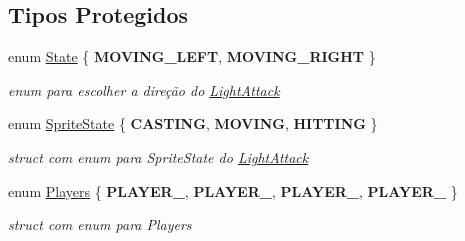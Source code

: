 \subsection*{Tipos Protegidos}
\begin{DoxyCompactItemize}
\item 
\mbox{\label{classLightAttack_abbd40d40cfc1c4d9ca5f8187b10848c8}} 
enum \mbox{\hyperlink{classLightAttack_abbd40d40cfc1c4d9ca5f8187b10848c8}{State}} \{ {\bfseries M\+O\+V\+I\+N\+G\+\_\+\+L\+E\+FT}, 
{\bfseries M\+O\+V\+I\+N\+G\+\_\+\+R\+I\+G\+HT}
 \}
\begin{DoxyCompactList}\small\item\em enum para escolher a direção do \mbox{\hyperlink{classLightAttack}{Light\+Attack}} \end{DoxyCompactList}\item 
\mbox{\label{classLightAttack_aa960f560c78a82323220598abcaff05b}} 
enum \mbox{\hyperlink{classLightAttack_aa960f560c78a82323220598abcaff05b}{Sprite\+State}} \{ {\bfseries C\+A\+S\+T\+I\+NG}, 
{\bfseries M\+O\+V\+I\+NG}, 
{\bfseries H\+I\+T\+T\+I\+NG}
 \}
\begin{DoxyCompactList}\small\item\em struct com enum para Sprite\+State do \mbox{\hyperlink{classLightAttack}{Light\+Attack}} \end{DoxyCompactList}\item 
\mbox{\label{classLightAttack_a8613f6cda38038fb3a460da67cd339d8}} 
enum \mbox{\hyperlink{classLightAttack_a8613f6cda38038fb3a460da67cd339d8}{Players}} \{ {\bfseries P\+L\+A\+Y\+E\+R\+\_}, 
{\bfseries P\+L\+A\+Y\+E\+R\+\_}, 
{\bfseries P\+L\+A\+Y\+E\+R\+\_}, 
{\bfseries P\+L\+A\+Y\+E\+R\+\_}
 \}
\begin{DoxyCompactList}\small\item\em struct com enum para Players \end{DoxyCompactList}\end{DoxyCompactItemize}
